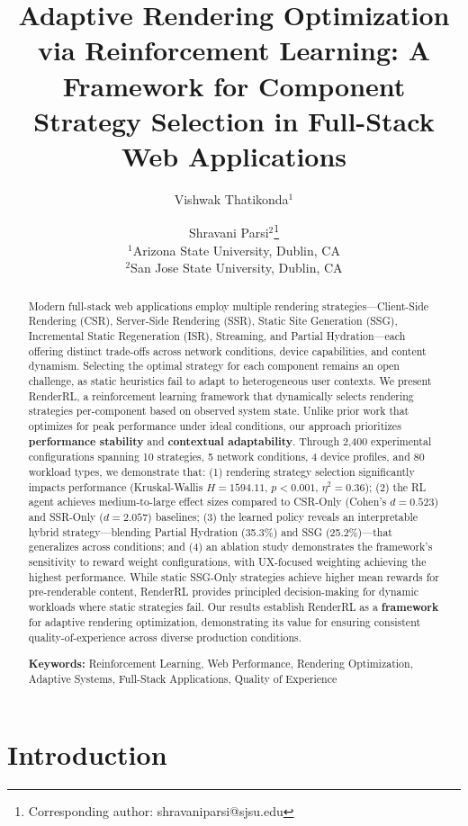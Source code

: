 \documentclass[10pt,twocolumn]{article}
\title{Adaptive Rendering Optimization via Reinforcement Learning: A Framework for Component Strategy Selection in Full-Stack Web Applications}
\author{
Vishwak Thatikonda$^{1}$ \and
Shravani Parsi$^{2}$\thanks{Corresponding author: shravaniparsi@sjsu.edu}\\[1em]
$^{1}$Arizona State University, Dublin, CA\\
$^{2}$San Jose State University, Dublin, CA
}
\date{}
\newcommand{\method}{RenderRL}
\begin{document}
\maketitle

\begin{abstract}
Modern full-stack web applications employ multiple rendering strategies---Client-Side Rendering (CSR), Server-Side Rendering (SSR), Static Site Generation (SSG), Incremental Static Regeneration (ISR), Streaming, and Partial Hydration---each offering distinct trade-offs across network conditions, device capabilities, and content dynamism. Selecting the optimal strategy for each component remains an open challenge, as static heuristics fail to adapt to heterogeneous user contexts. We present \method{}, a reinforcement learning framework that dynamically selects rendering strategies per-component based on observed system state. Unlike prior work that optimizes for peak performance under ideal conditions, our approach prioritizes \textbf{performance stability} and \textbf{contextual adaptability}. Through 2,400 experimental configurations spanning 10 strategies, 5 network conditions, 4 device profiles, and 80 workload types, we demonstrate that: (1) rendering strategy selection significantly impacts performance (Kruskal-Wallis $H = 1594.11$, $p < 0.001$, $\eta^2 = 0.36$); (2) the RL agent achieves medium-to-large effect sizes compared to CSR-Only (Cohen's $d = 0.523$) and SSR-Only ($d = 2.057$) baselines; (3) the learned policy reveals an interpretable hybrid strategy---blending Partial Hydration (35.3\%) and SSG (25.2\%)---that generalizes across conditions; and (4) an ablation study demonstrates the framework's sensitivity to reward weight configurations, with UX-focused weighting achieving the highest performance. While static SSG-Only strategies achieve higher mean rewards for pre-renderable content, \method{} provides principled decision-making for dynamic workloads where static strategies fail. Our results establish \method{} as a \textbf{framework} for adaptive rendering optimization, demonstrating its value for ensuring consistent quality-of-experience across diverse production conditions.

\vspace{1em}
\noindent\textbf{Keywords:} Reinforcement Learning, Web Performance, Rendering Optimization, Adaptive Systems, Full-Stack Applications, Quality of Experience
\end{abstract}

\section{Introduction}
\end{document}

